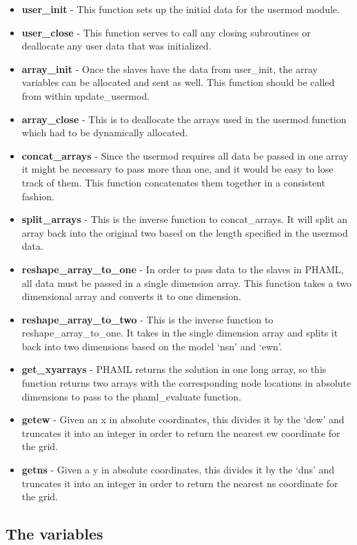 \begin{itemize}
\item \textbf{user\_init} - This function sets up the initial data for the usermod module.
\item \textbf{user\_close} - This function serves to call any closing subroutines or deallocate any user data that was initialized.
\item \textbf{array\_init} - Once the slaves have the data from user\_init, the array variables can be allocated and sent as well.  This function should be called from within update\_usermod.
\item \textbf{array\_close} - This is to deallocate the arrays used in the usermod function which had to be dynamically allocated.
\item \textbf{concat\_arrays} - Since the usermod requires all data be passed in one array it might be necessary to pass more than one, and it would be easy to lose track of them.  This function concatenates them together in a consistent fashion.
\item \textbf{split\_arrays} - This is the inverse function to concat\_arrays.  It will split an array back into the original two based on the length specified in the usermod data. 
\item \textbf{reshape\_array\_to\_one} - In order to pass data to the slaves in PHAML, all data must be passed in a single dimension array.  This function takes a two dimensional array and converts it to one dimension.
\item \textbf{reshape\_array\_to\_two} - This is the inverse function to reshape\_array\_to\_one.  It takes in the single dimension array and splits it back into two dimensions based on the model `nsn' and `ewn'.
\item \textbf{get\_xyarrays} - PHAML returns the solution in one long array, so this function returns two arrays with the corresponding node locations in absolute dimensions to pass to the phaml\_evaluate function.
\item \textbf{getew} - Given an x in absolute coordinates, this divides it by the `dew' and truncates it into an integer in order to return the nearest ew coordinate for the grid.
\item \textbf{getns} - Given a y in absolute coordinates, this divides it by the `dns' and truncates it into an integer in order to return the nearest ns coordinate for the grid.
\end{itemize}

\subsection{The variables}

